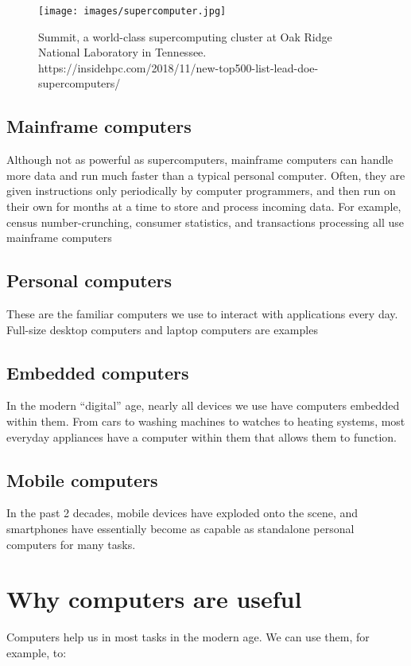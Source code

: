 \begin{figure}
	\centering
	\texttt{[image: images/supercomputer.jpg]}
	\caption{Summit, a world-class supercomputing cluster at Oak Ridge National Laboratory in Tennessee. https://insidehpc.com/2018/11/new-top500-list-lead-doe-supercomputers/}
	\label{fig:supercomputer}
\end{figure}

\subsection{Mainframe computers}
Although not as powerful as supercomputers, mainframe computers can handle more data and run much faster than a typical personal computer. Often, they are given instructions only periodically by computer programmers, and then run on their own for months at a time to store and process incoming data. For example, census number-crunching, consumer statistics, and transactions processing all use mainframe computers

\subsection{Personal computers}
These are the familiar computers we use to interact with applications every day. Full-size desktop computers and laptop computers are examples

\subsection{Embedded computers}
In the modern ``digital'' age, nearly all devices we use have computers embedded within them. From cars to washing machines to watches to heating systems, most everyday appliances have a computer within them that allows them to function.

\subsection{Mobile computers}
In the past 2 decades, mobile devices have exploded onto the scene, and smartphones have essentially become as capable as standalone personal computers for many tasks.

\section{Why computers are useful}

Computers help us in most tasks in the modern age. We can use them, for example, to:

